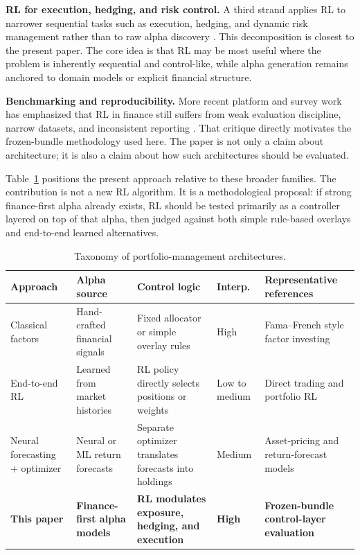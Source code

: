 \documentclass[11pt]{article}
\begin{document}
\textbf{RL for execution, hedging, and risk control.} A third strand applies RL
to narrower sequential tasks such as execution, hedging, and dynamic risk
management rather than to raw alpha discovery \cite{nevmyvaka2006,kolm2019hedge,
buehler2019,du2020}. This decomposition is closest to the present paper. The
core idea is that RL may be most useful where the problem is inherently
sequential and control-like, while alpha generation remains anchored to domain
models or explicit financial structure.

\textbf{Benchmarking and reproducibility.} More recent platform and survey work
has emphasized that RL in finance still suffers from weak evaluation discipline,
narrow datasets, and inconsistent reporting \cite{sun2023,jander2025}. That
critique directly motivates the frozen-bundle methodology used here. The paper
is not only a claim about architecture; it is also a claim about how such
architectures should be evaluated.

Table~\ref{tab:taxonomy} positions the present approach relative to these
broader families. The contribution is not a new RL algorithm. It is a
methodological proposal: if strong finance-first alpha already exists, RL should
be tested primarily as a controller layered on top of that alpha, then judged
against both simple rule-based overlays and end-to-end learned alternatives.

\begin{table}[H]
\centering
\scriptsize
\caption{Taxonomy of portfolio-management architectures.}
\label{tab:taxonomy}
\begin{tabular}{@{} >{\raggedright\arraybackslash}p{2.1cm}
                >{\raggedright\arraybackslash}p{2.1cm}
                >{\raggedright\arraybackslash}p{2.15cm}
                >{\raggedright\arraybackslash}p{1.45cm}
                >{\raggedright\arraybackslash}p{4.2cm} @{}}
\toprule
\textbf{Approach} & \textbf{Alpha source} & \textbf{Control logic} & \textbf{Interp.} & \textbf{Representative references} \\
\midrule
Classical factors & Hand-crafted financial signals & Fixed allocator or simple overlay rules & High & Fama--French style factor investing \cite{fama1993} \\
End-to-end RL & Learned from market histories & RL policy directly selects positions or weights & Low to medium & Direct trading and portfolio RL \cite{moody2001,jiang2017,zhang2020,cong2021} \\
Neural forecasting + optimizer & Neural or ML return forecasts & Separate optimizer translates forecasts into holdings & Medium & Asset-pricing and return-forecast models \cite{gu2020,chen2021,giglio2022} \\
\textbf{This paper} & \textbf{Finance-first alpha models} & \textbf{RL modulates exposure, hedging, and execution} & \textbf{High} & \textbf{Frozen-bundle control-layer evaluation} \\
\bottomrule
\end{tabular}
\end{table}
\end{document}
